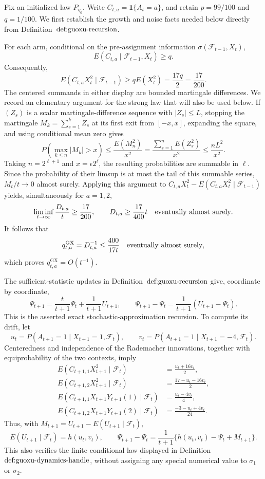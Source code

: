 Fix an initialized law \(P_{\eta _0}\).  Write \(C_{t,a}=\mathbf 1\{A_t=a\}\), and retain \(p=99/100\) and \(q=1/100\).  We first establish the growth and noise facts needed below directly from Definition~\(\textnormal{def:guoxu-recursion}\).

For each arm, conditional on the pre-assignment information \(\sigma(\mathcal F_{t-1},X_t)\),
\[
 E(C_{t,a}\mid\mathcal F_{t-1},X_t)\ge q.
\]
Consequently,
\[
 E(C_{t,a}X_t^2\mid\mathcal F_{t-1})
 \ge qE(X_t^2)=\frac{17q}{2}=\frac{17}{200}.
\]
The centered summands in either display are bounded martingale differences.  We record an elementary argument for the strong law that will also be used below.  If \((Z_s)\) is a scalar martingale-difference sequence with \(|Z_s|\le L\), stopping the martingale \(M_k=\sum_{s=1}^kZ_s\) at its first exit from \([-x,x]\), expanding the square, and using conditional mean zero gives
\[
 P\!\left(\max_{k\le n}|M_k|>x\right)
 \le \frac{E(M_n^2)}{x^2}
 =\frac{\sum_{s=1}^nE(Z_s^2)}{x^2}
 \le \frac{nL^2}{x^2}.
\]
Taking \(n=2^{\ell+1}\) and \(x=\epsilon 2^\ell\), the resulting probabilities are summable in \(\ell\).  Since the probability of their limsup is at most the tail of this summable series, \(M_t/t\to0\) almost surely.  Applying this argument to \(C_{t,a}X_t^2-E(C_{t,a}X_t^2\mid\mathcal F_{t-1})\) yields, simultaneously for \(a=1,2\),
\[
 \liminf_{t\to\infty}\frac{D_{t,a}}t\ge\frac{17}{200},
 \qquad
 D_{t,a}\ge\frac{17}{400}t\quad\hbox{eventually almost surely}.
\]
It follows that
\[
 q^{\mathrm{GX}}_{t,a}=D_{t,a}^{-1}\le\frac{400}{17t}
 \quad\hbox{eventually almost surely},
\]
which proves \(q^{\mathrm{GX}}_{t,a}=O(t^{-1})\).

The sufficient-statistic updates in Definition~\(\textnormal{def:guoxu-recursion}\) give, coordinate by coordinate,
\[
 \Psi_{t+1}
 =\frac{t}{t+1}\Psi_t+\frac1{t+1}U_{t+1},
 \qquad
 \Psi_{t+1}-\Psi_t=\frac1{t+1}(U_{t+1}-\Psi_t).
\]
This is the asserted exact stochastic-approximation recursion.  To compute its drift, let
\[
 u_t=P(A_{t+1}=1\mid X_{t+1}=1,\mathcal F_t),
 \qquad
 v_t=P(A_{t+1}=1\mid X_{t+1}=-4,\mathcal F_t).
\]
Centeredness and independence of the Rademacher innovations, together with equiprobability of the two contexts, imply
\[
 \begin{aligned}
 E(C_{t+1,1}X_{t+1}^2\mid\mathcal F_t)&=\frac{u_t+16v_t}{2},\\
 E(C_{t+1,2}X_{t+1}^2\mid\mathcal F_t)&=\frac{17-u_t-16v_t}{2},\\
 E(C_{t+1,1}X_{t+1}Y_{t+1}(1)\mid\mathcal F_t)&=\frac{u_t-4v_t}{4},\\
 E(C_{t+1,2}X_{t+1}Y_{t+1}(2)\mid\mathcal F_t)&=\frac{-3-u_t+4v_t}{24}.
 \end{aligned}
\]
Thus, with \(M_{t+1}=U_{t+1}-E(U_{t+1}\mid\mathcal F_t)\),
\[
 E(U_{t+1}\mid\mathcal F_t)=h(u_t,v_t),
 \qquad
 \Psi_{t+1}-\Psi_t
 =\frac1{t+1}\{h(u_t,v_t)-\Psi_t+M_{t+1}\}.
\]
This also verifies the finite conditional law displayed in Definition~\(\textnormal{def:guoxu-dynamics-handle}\), without assigning any special numerical value to \(\sigma_1\) or \(\sigma_2\).

